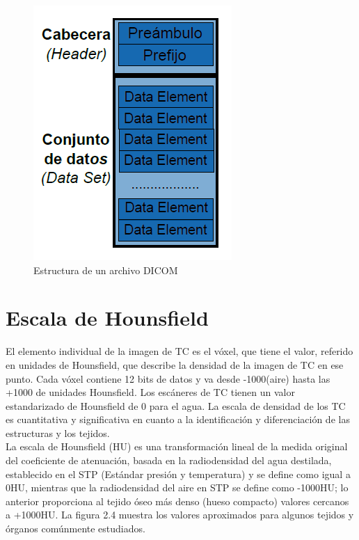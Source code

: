 \documentclass[12pt]{report}
\begin{document}
\begin{figure}[H]
\centering
\includegraphics[width = 7 cm, height = 8 cm]{estructura}
\caption{Estructura de un archivo DICOM}
\end{figure}

\section{Escala de Hounsfield}
El elemento individual de la imagen de TC es el vóxel, que tiene el valor, referido en unidades de Hounsfield, que describe la densidad de la imagen de TC en ese punto. Cada vóxel contiene 12 bits de datos y va desde -1000(aire) hasta las +1000 de unidades Hounsfield. Los escáneres de TC tienen un valor estandarizado de Hounsfield de 0 para el agua. La escala de densidad de los TC es cuantitativa y significativa en cuanto a la identificación y diferenciación de las estructuras y los tejidos.\cite{hounsuno}\\

La escala de Hounsfield (HU) es una transformación lineal de la medida original del coeficiente de atenuación, basada en la radiodensidad del agua destilada, establecido en el STP (Estándar presión y temperatura) y se define como igual a 0HU, mientras que la radiodensidad del aire en STP se define como -1000HU; lo anterior proporciona al tejido óseo más denso (hueso compacto) valores cercanos a +1000HU. La figura 2.4 muestra los valores aproximados para algunos tejidos y órganos comúnmente estudiados.\\
\end{document}
